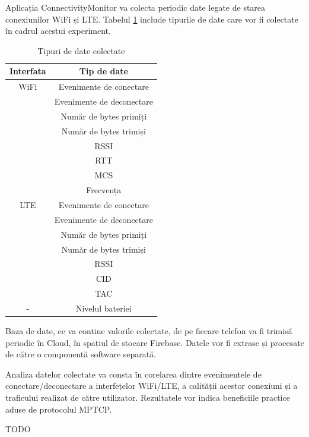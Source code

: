 Aplicația ConnectivityMonitor va colecta periodic date legate de starea conexiunilor WiFi și LTE. Tabelul \ref{tab:date} include tipurile de date care vor fi colectate în cadrul acestui experiment.

\begin{table}[h]
\centering
\caption{Tipuri de date colectate}
\label{tab:date}
\begin{tabular}{c | c}
\hline
Interfata & Tip de date  \\
\hline
WiFi & Evenimente de conectare \\
 & Evenimente de deconectare \\
 & Număr de bytes primiți \\
 & Număr de bytes trimiși \\
 & RSSI \\
 & RTT \\
 & MCS \\
 & Frecvența \\
\hline
LTE & Evenimente de conectare \\
 & Evenimente de deconectare \\
 & Număr de bytes primiți \\
 & Număr de bytes trimiși \\
 & RSSI \\
 & CID \\
 & TAC \\
\hline
- & Nivelul bateriei \\
\hline
\end{tabular}
\end{table}

Baza de date, ce va contine valorile colectate, de pe fiecare telefon va fi trimisă periodic în Cloud, în spațiul de stocare Firebase. Datele vor fi extrase și procesate de către o componentă software separată.

Analiza datelor colectate va consta în corelarea dintre evenimentele de conectare/deconectare a interfețelor WiFi/LTE, a calității acestor conexiuni și a traficului realizat de către utilizator. Rezultatele vor indica beneficiile practice aduse de protocolul MPTCP.


TODO


